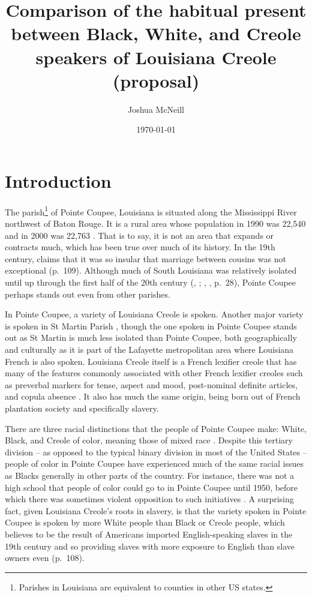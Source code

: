 \documentclass{article}
\title{Comparison of the habitual present between Black, White, and Creole speakers of Louisiana Creole (proposal)}
\author{Joshua McNeill}
\date{\today}
\begin{document}
  \maketitle
  \doublespacing
  \section{Introduction}
    The parish\footnote{Parishes in Louisiana are equivalent to counties in other US states.} of Pointe Coupee, Louisiana is situated along the Mississippi River northwest of Baton Rouge.
    It is a rural area whose population in 1990 was 22,540 and in 2000 was 22,763 \parencite{us_census_bureau_census_2001}.
    That is to say, it is not an area that expands or contracts much, which has been true over much of its history.
    In the 19th century, \textcite{klingler_if_2003} claims that it was so insular that marriage between cousins was not exceptional (p.~109).
    Although much of South Louisiana was relatively isolated until up through the first half of the 20th century (\citeauthor{gold_french_1979}, \citeyear{gold_french_1979}; \citeauthor{johnson_louisiana_1976}, \citeyear{johnson_louisiana_1976}, p.~28), Pointe Coupee perhaps stands out even from other parishes.

    In Pointe Coupee, a variety of Louisiana Creole is spoken.
    Another major variety is spoken in St Martin Parish \parencite{neumann_creole_1985}, though the one spoken in Pointe Coupee stands out as St Martin is much less isolated than Pointe Coupee, both geographically and culturally as it is part of the Lafayette metropolitan area where Louisiana French is also spoken.
    Louisiana Creole itself is a French lexifier creole that has many of the features commonly associated with other French lexifier creoles such as preverbal markers for tense, aspect and mood, post-nominal definite articles, and copula absence \parencite[p.~63]{klingler_if_2003}.
    It also has much the same origin, being born out of French plantation society and specifically slavery.

    There are three racial distinctions that the people of Pointe Coupee make: White, Black, and Creole of color, meaning those of mixed race \parencite[p.~xxv]{klingler_if_2003}.
    Despite this tertiary division -- as opposed to the typical binary division in most of the United States -- people of color in Pointe Coupee have experienced much of the same racial issues as Blacks generally in other parts of the country.
    For instance, there was not a high school that people of color could go to in Pointe Coupee until 1950, before which there was sometimes violent opposition to such initiatives \parencite[p.~122]{klingler_if_2003}.
    A surprising fact, given Louisiana Creole's roots in slavery, is that the variety spoken in Pointe Coupee is spoken by more White people than Black or Creole people, which \textcite{klingler_if_2003} believes to be the result of Americans imported English-speaking slaves in the 19th century and so providing slaves with more exposure to English than slave owners even (p.~108).
\end{document}
